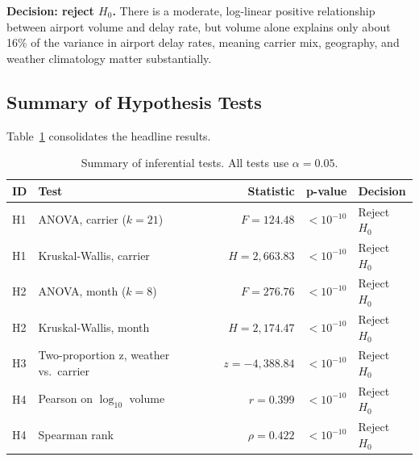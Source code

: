 \documentclass[12pt,letterpaper]{article}
\begin{document}
\textbf{Decision: reject $H_0$.} There is a moderate, log-linear positive
relationship between airport volume and delay rate, but volume alone
explains only about 16\% of the variance in airport delay rates,
meaning carrier mix, geography, and weather climatology matter
substantially.

\subsection{Summary of Hypothesis Tests}
Table~\ref{tab:tests} consolidates the headline results.

\begin{table}[H]
\centering
\caption{Summary of inferential tests. All tests use $\alpha = 0.05$.}
\label{tab:tests}
\small
\renewcommand{\arraystretch}{1.10}
\begin{tabularx}{\linewidth}{l X r r l}
\toprule
\textbf{ID} & \textbf{Test} & \textbf{Statistic} & \textbf{p-value} & \textbf{Decision} \\
\midrule
H1 & ANOVA, carrier ($k\!=\!21$)            & $F=124.48$       & $<10^{-10}$ & Reject $H_0$ \\
H1 & Kruskal-Wallis, carrier                & $H=2{,}663.83$   & $<10^{-10}$ & Reject $H_0$ \\
H2 & ANOVA, month ($k\!=\!8$)               & $F=276.76$       & $<10^{-10}$ & Reject $H_0$ \\
H2 & Kruskal-Wallis, month                  & $H=2{,}174.47$   & $<10^{-10}$ & Reject $H_0$ \\
H3 & Two-proportion z, weather vs.\ carrier & $z=-4{,}388.84$  & $<10^{-10}$ & Reject $H_0$ \\
H4 & Pearson on $\log_{10}$ volume          & $r=0.399$        & $<10^{-10}$ & Reject $H_0$ \\
H4 & Spearman rank                          & $\rho=0.422$     & $<10^{-10}$ & Reject $H_0$ \\
\bottomrule
\end{tabularx}
\end{table}
\end{document}
